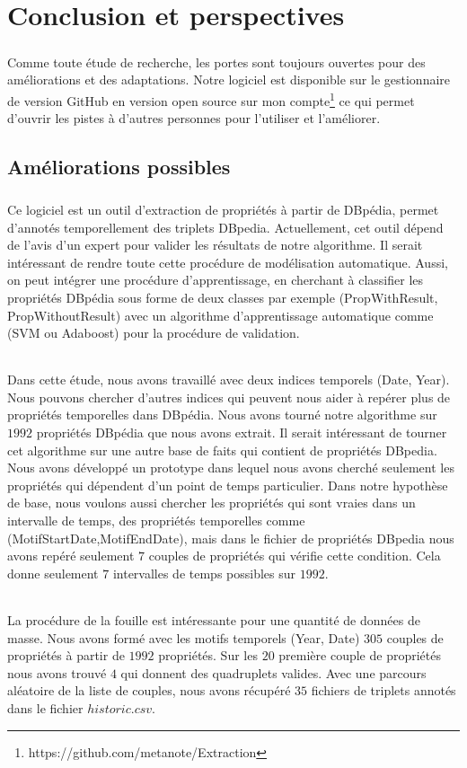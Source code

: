 \chapter{Conclusion et perspectives}
\paragraph{}
Comme toute étude de recherche, les portes sont toujours ouvertes pour des améliorations et des adaptations. Notre logiciel est disponible sur le gestionnaire de version GitHub en version open source sur mon compte\footnote{https://github.com/metanote/Extraction} ce qui permet d'ouvrir les pistes à d'autres personnes pour l'utiliser et l'améliorer. 
\section*{Améliorations possibles}
\paragraph{}
Ce logiciel est un outil d'extraction de propriétés à partir de DBpédia, permet d'annotés temporellement des triplets DBpedia. Actuellement, cet outil dépend de l'avis d'un expert pour valider les résultats de notre algorithme. Il serait intéressant de rendre toute cette procédure de modélisation automatique. Aussi, on peut intégrer une procédure d'apprentissage, en cherchant à classifier les propriétés DBpédia sous forme de deux classes par exemple (PropWithResult, PropWithoutResult) avec un algorithme d'apprentissage automatique comme (SVM ou Adaboost) pour la procédure de validation.
\subparagraph{}
Dans cette étude, nous avons travaillé avec deux indices temporels (Date, Year). Nous pouvons chercher d'autres indices qui peuvent nous aider à repérer plus de propriétés temporelles dans DBpédia. Nous avons tourné notre algorithme sur $1992$ propriétés DBpédia que nous avons extrait. Il serait intéressant de tourner cet algorithme sur une autre base de faits qui contient de propriétés DBpedia.
Nous avons développé un prototype dans lequel nous avons cherché seulement les propriétés qui dépendent d'un point de temps particulier.
Dans notre hypothèse de base, nous voulons aussi chercher les propriétés qui sont vraies dans un intervalle de temps, des propriétés temporelles comme (MotifStartDate,MotifEndDate), mais dans le fichier de propriétés DBpedia nous avons repéré seulement $7$ couples de propriétés qui vérifie cette condition. Cela donne seulement $7$ intervalles de temps possibles sur $1992$.
\subparagraph{}
La procédure de la fouille est intéressante pour une quantité de données de masse. Nous avons formé avec les motifs temporels (Year, Date) $305$ couples de propriétés à partir de $1992$ propriétés. Sur les $20$ première couple de propriétés nous avons trouvé $4$ qui donnent des quadruplets valides. Avec une parcours aléatoire de la liste de couples, nous avons récupéré $35$ fichiers de triplets annotés dans le fichier $historic.csv$.
